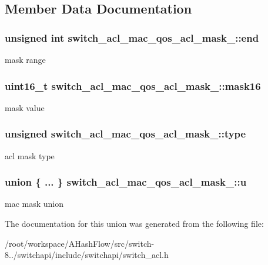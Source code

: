 \subsection{Member Data Documentation}
\hypertarget{unionswitch__acl__mac__qos__acl__mask___a66fac46784376e433a46541c316019e6}{
\subsubsection[{end}]{\setlength{\rightskip}{0pt plus 5cm}unsigned int switch\+\_\+acl\+\_\+mac\+\_\+qos\+\_\+acl\+\_\+mask\+\_\+\+::end}}\label{unionswitch__acl__mac__qos__acl__mask___a66fac46784376e433a46541c316019e6}
mask range \hypertarget{unionswitch__acl__mac__qos__acl__mask___a48560a5cc896e229da8c9ffb9672019f}{
\subsubsection[{mask16}]{\setlength{\rightskip}{0pt plus 5cm}uint16\+\_\+t switch\+\_\+acl\+\_\+mac\+\_\+qos\+\_\+acl\+\_\+mask\+\_\+\+::mask16}}\label{unionswitch__acl__mac__qos__acl__mask___a48560a5cc896e229da8c9ffb9672019f}
mask value \hypertarget{unionswitch__acl__mac__qos__acl__mask___aaac08b207b271d9b28aace0f71b4cadc}{
\subsubsection[{type}]{\setlength{\rightskip}{0pt plus 5cm}unsigned switch\+\_\+acl\+\_\+mac\+\_\+qos\+\_\+acl\+\_\+mask\+\_\+\+::type}}\label{unionswitch__acl__mac__qos__acl__mask___aaac08b207b271d9b28aace0f71b4cadc}
acl mask type \hypertarget{unionswitch__acl__mac__qos__acl__mask___a13d5734593a3996cb9d5c0faeee46f9d}{
\subsubsection[{u}]{\setlength{\rightskip}{0pt plus 5cm}union \{ ... \}   switch\+\_\+acl\+\_\+mac\+\_\+qos\+\_\+acl\+\_\+mask\+\_\+\+::u}}\label{unionswitch__acl__mac__qos__acl__mask___a13d5734593a3996cb9d5c0faeee46f9d}
mac mask union 

The documentation for this union was generated from the following file\+:\begin{DoxyCompactItemize}
\item 
/root/workspace/\+A\+Hash\+Flow/src/switch-\/8../switchapi/include/switchapi/switch\+\_\+acl.\+h\end{DoxyCompactItemize}
